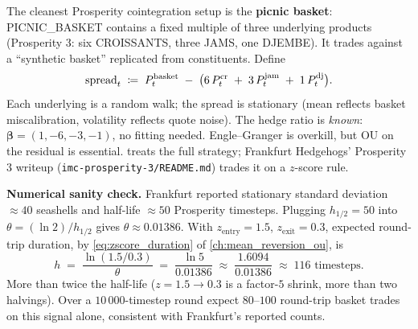 \begin{prosperitybox}[title={Prosperity example: PICNIC\_BASKET as a cointegration trade}]
The cleanest Prosperity cointegration setup is the \textbf{picnic
basket}: PICNIC\_BASKET contains a fixed multiple of three
underlying products (Prosperity 3: six CROISSANTS, three JAMS,
one DJEMBE). It trades against a ``synthetic basket'' replicated
from constituents. Define
\begin{equation}
  \text{spread}_t \;\coloneqq\; P_t^{\text{basket}}
  \;-\; \bigl(6\,P_t^{\text{cr}} \;+\; 3\,P_t^{\text{jam}} \;+\; 1\,P_t^{\text{dj}}\bigr).
  \label{eq:basket_spread}
\end{equation}
Each underlying is a random walk; the spread is stationary (mean
reflects basket miscalibration, volatility reflects quote noise).
The hedge ratio is \emph{known}: $\bm\beta = (1, -6, -3, -1)$, no
fitting needed. Engle--Granger is overkill, but OU on the residual
is essential.  treats the full strategy;
Frankfurt Hedgehogs' Prosperity 3 writeup
(\texttt{imc-prosperity-3/README.md}) trades it on a $z$-score rule.

\textbf{Numerical sanity check.} Frankfurt reported stationary
standard deviation $\approx 40$ seashells and half-life
$\approx 50$ Prosperity timesteps. Plugging $h_{1/2} = 50$ into
$\theta = (\ln 2)/h_{1/2}$ gives $\theta \approx 0.01386$. With
$z_{\text{entry}} = 1.5$, $z_{\text{exit}} = 0.3$, expected
round-trip duration, by \eqref{eq:zscore_duration} of
\cref{ch:mean_reversion_ou}, is
\begin{equation}
  h \;=\; \frac{\ln(1.5/0.3)}{\theta}
       \;=\; \frac{\ln 5}{0.01386}
       \;\approx\; \frac{1.6094}{0.01386}
       \;\approx\; 116 \text{ timesteps}.
  \label{eq:basket_duration}
\end{equation}
More than twice the half-life ($z = 1.5 \to 0.3$ is a factor-$5$
shrink, more than two halvings). Over a $10\,000$-timestep round
expect $80$--$100$ round-trip basket trades on this signal alone,
consistent with Frankfurt's reported counts.
\end{prosperitybox}

